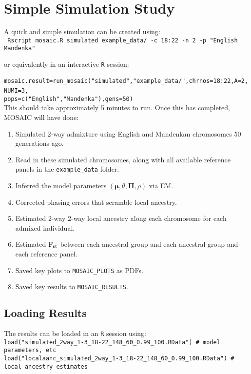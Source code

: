 \documentclass{article}
\begin{document}
\section{Simple Simulation Study}



A quick and simple simulation can be created using:\\
\verb+ Rscript mosaic.R simulated example_data/ -c 18:22 -n 2 -p "English Mandenka"+

or equivalently in an interactive \texttt{R} session:\\
\verb+ mosaic.result=run_mosaic("simulated","example_data/",chrnos=18:22,A=2,NUMI=3,+
\verb+                                pops=c("English","Mandenka"),gens=50) +\\
This should take approximately 5 minutes to run. 
Once this has completed, MOSAIC will have done:
\begin{enumerate}
  \item Simulated 2-way admixture using English and Mandenkan chromosomes $50$ generations ago.
  \item Read in these simulated chromosomes, along with all available reference panels in the \texttt{example\_data} folder.
  \item Inferred the model parameters $(\bm\mu, \theta, \bm\Pi, \rho)$ via EM.
  \item Corrected phasing errors that scramble local ancestry. 
  \item Estimated 2-way 2-way local ancestry along each chromosome for each admixed individual. 
  \item Estimated $\textrm{F}_{\textrm{st}}$ between each ancestral group and each ancestral group and each reference panel. 
  \item Saved key plots to \texttt{MOSAIC\_PLOTS} as PDFs.
  \item Saved key results to \texttt{MOSAIC\_RESULTS}.
\end{enumerate}

\subsection{Loading Results}
The results can be loaded in an \texttt{R} session using:\\
\verb+load("simulated_2way_1-3_18-22_148_60_0.99_100.RData") # model parameters, etc+  \\
\verb+load("localaanc_simulated_2way_1-3_18-22_148_60_0.99_100.RData") # local ancestry estimates+ 
\end{document}
